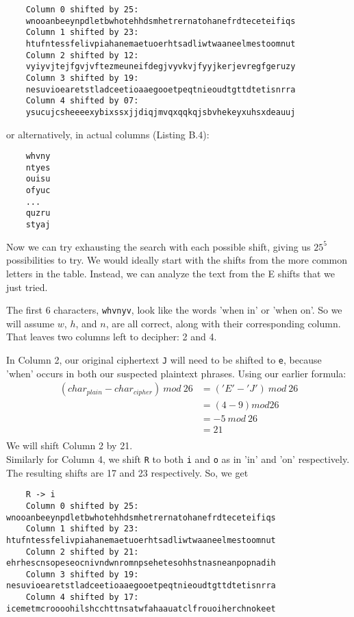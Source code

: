 \documentclass[10pt,letterpaper]{report}
\begin{document}
\begin{enumerate}
	\begin{verbatim}
	Column 0 shifted by 25: 
	wnooanbeeynpdletbwhotehhdsmhetrernatohanefrdteceteifiqs
	Column 1 shifted by 23: 
	htufntessfelivpiahanemaetuoerhtsadliwtwaaneelmestoomnut
	Column 2 shifted by 12: 
	vyiyvjtejfgvjvftezmeuneifdegjvyvkvjfyyjkerjevregfgeruzy
	Column 3 shifted by 19: 
	nesuvioearetstladceetioaaegooetpeqtnieoudtgttdtetisnrra
	Column 4 shifted by 07: 
	ysucujcsheeeexybixssxjjdiqjmvqxqqkqjsbvhekeyxuhsxdeauuj
	\end{verbatim}
	or alternatively, in actual columns (Listing B.4):
	\begin{verbatim}
	whvny
	ntyes
	ouisu
	ofyuc
	...
	quzru
	styaj
	\end{verbatim}
	
	Now we can try exhausting the search with each possible shift, giving us $25^5$
	possibilities to try. We would ideally start with the shifts from the more
	common letters in the table. Instead, we can analyze the text from the E shifts that
	we just tried.
	\par
	The first 6 characters, \verb|whvnyv|, look like the words 'when in' or 'when on'.
	So we will assume $w$, $h$, and $n$, are all correct, along with their corresponding
	column. That leaves two columns left to decipher: 2 and 4.
	\par
	In Column 2, our original ciphertext \verb|J| will need to be shifted to \verb|e|,
	because 'when' occurs in both our suspected plaintext phrases. Using our earlier
	formula:
	\begin{align*}
		(char_{plain} - char_{cipher})\ mod\ 26 &= ('E' - 'J')\ mod\ 26 \\
		 &= (4 - 9) mod 26 \\
		&= -5\ mod\ 26 \\
		&= 21 \\
	\end{align*}
	We will shift Column 2 by 21. \\
	Similarly for Column 4, we shift \verb|R| to both \verb|i| and \verb|o| as in 'in' and 'on' respectively. The resulting shifts are 17 and 23 respectively. So, we get
	\par
	\begin{verbatim}
	R -> i
	Column 0 shifted by 25: wnooanbeeynpdletbwhotehhdsmhetrernatohanefrdteceteifiqs
	Column 1 shifted by 23: htufntessfelivpiahanemaetuoerhtsadliwtwaaneelmestoomnut
	Column 2 shifted by 21: ehrhescnsopeseocnivndwnromnpsehetesohhstnasneanpopnadih
	Column 3 shifted by 19: nesuvioearetstladceetioaaegooetpeqtnieoudtgttdtetisnrra
	Column 4 shifted by 17: icemetmcroooohilshcchttnsatwfahaauatclfrouoiherchnokeet
	

\end{verbatim}
\end{enumerate}
\end{document}
